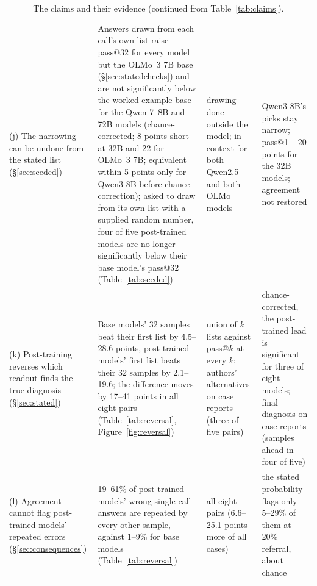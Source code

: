 \documentclass[11pt]{article}
\begin{document}
\begin{table}[p]
\begin{tabular}{L{2.8cm}L{4.6cm}L{3.4cm}L{3.6cm}}
(j) The narrowing can be undone from the stated list (\S\ref{sec:seeded}) & Answers drawn from each call's own list raise pass@32 for every model but the OLMo~3 7B base (\S\ref{sec:statedchecks}) and are not significantly below the worked-example base for the Qwen 7--8B and 72B models (chance-corrected; 8 points short at 32B and 22 for OLMo~3 7B; equivalent within 5 points only for Qwen3-8B before chance correction); asked to draw from its own list with a supplied random number, four of five post-trained models are no longer significantly below their base model's pass@32 (Table~\ref{tab:seeded}) & drawing done outside the model; in-context for both Qwen2.5 and both OLMo models & Qwen3-8B's picks stay narrow; pass@1 $-20$ points for the 32B models; agreement not restored \\
(k) Post-training reverses which readout finds the true diagnosis (\S\ref{sec:stated}) & Base models' 32 samples beat their first list by 4.5--28.6 points, post-trained models' first list beats their 32 samples by 2.1--19.6; the difference moves by 17--41 points in all eight pairs (Table~\ref{tab:reversal}, Figure~\ref{fig:reversal}) & union of $k$ lists against pass@$k$ at every $k$; authors' alternatives on case reports (three of five pairs) & chance-corrected, the post-trained lead is significant for three of eight models; final diagnosis on case reports (samples ahead in four of five) \\
(l) Agreement cannot flag post-trained models' repeated errors (\S\ref{sec:consequences}) & 19--61\% of post-trained models' wrong single-call answers are repeated by every other sample, against 1--9\% for base models (Table~\ref{tab:reversal}) & all eight pairs (6.6--25.1 points more of all cases) & the stated probability flags only 5--29\% of them at 20\% referral, about chance \\
\bottomrule
\end{tabular}
\caption{The claims and their evidence (continued from Table~\ref{tab:claims}).}
\label{tab:claims2}
\end{table}
\end{document}
